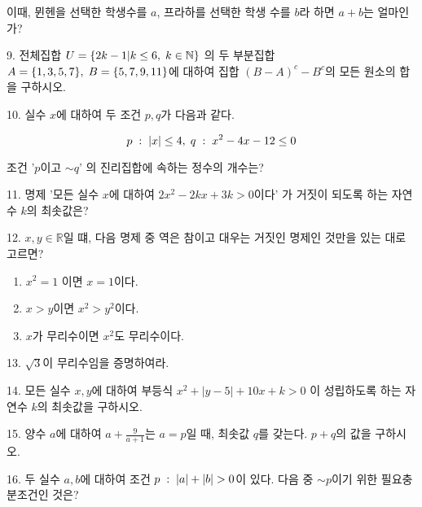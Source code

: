 \documentclass[paper=a4, fontsize=11pt]{scrartcl} %
\numberwithin{equation}{section} %
\numberwithin{figure}{section} %
\numberwithin{table}{section} %
\theoremstyle{plain}
\newcommand{\Com}{,\Hs}
\newcommand{\Hs}{\hspace{0.1cm}}
\newcommand{\Set}[1]{\{ #1 \}}
\newcommand{\CSet}[2][x]{\{#1 | #2 \}}
\newcommand{\N}{\mathbb{N}}
\newcommand{\R}{\mathbb{R}}
\begin{document}
이때, 뮌헨을 선택한 학생수를 $a$, 프라하를 선택한 학생 수를 $b$라 하면 $a+b$는 얼마인가?

\vspace{5cm}

9. 전체집합 $U=\CSet[2k-1]{k \leq 6 \Com k\in \N}$ 의 두 부분집합 $A=\Set{1,3,5,7}\Com B=\Set{5,7,9,11}$에 대하여 집합 $(B-A)^c -B^c$의 모든 원소의 합을
구하시오.

\pagebreak


10. 실수 $x$에 대하여 두 조건 $p,q$가 다음과 같다. 

\begin{equation*}
 p\Hs :\Hs |x|\leq 4\Com q\Hs :\Hs x^2 -4x-12\leq 0
\end{equation*}

조건 '$p$이고 $\sim q$' 의 진리집합에 속하는 정수의 개수는?

\vspace{3cm}

11. 명제 '모든 실수 $x$에 대하여 $2x^2 -2kx+3k>0$이다' 가 거짓이 되도록 하는 자연수 $k$의 최솟값은?

\vspace{2.5cm}

12. $x,y \in \R$일 떄, 다음 명제 중 역은 참이고 대우는 거짓인 명제인 것만을 있는 대로 고르면?

\begin{enumerate}
 \item $x^2 =1$ 이면 $x=1$이다.
 \item $x>y$이면 $x^2 > y^2$이다.
 \item $x$가 무리수이면 $x^2$도 무리수이다.
\end{enumerate}

\vspace{2.5cm}

13. $\sqrt{3}$이 무리수임을 증명하여라.

\pagebreak
14. 모든 실수 $x,y$에 대하여 부등식 $x^2 + |y-5| +10x+k>0$ 이 성립하도록 하는 자연수 $k$의 최솟값을 구하시오.

\vspace{3cm}

15. 양수 $a$에 대하여 $a + \frac{9}{a+1}$는 $a=p$일 때, 최솟값 $q$를 갖는다. $p+q$의 값을 구하시오.

\vspace{3cm}

16. 두 실수 $a,b$에 대하여 조건 $p\Hs:\Hs|a|+|b|>0$이 있다. 다음 중 $\sim p$이기 위한 필요충분조건인 것은?
\end{document}
